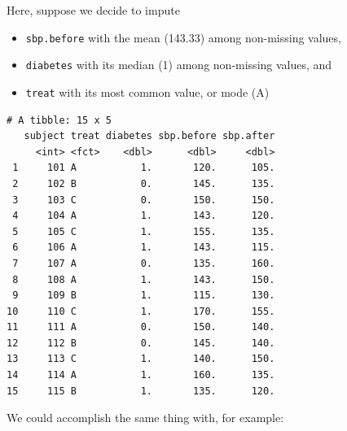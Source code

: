 \documentclass[]{book}
\newenvironment{Shaded}{\begin{snugshade}}{\end{snugshade}}
\newcommand{\KeywordTok}[1]{\textcolor[rgb]{0.13,0.29,0.53}{\textbf{#1}}}
\newcommand{\DataTypeTok}[1]{\textcolor[rgb]{0.13,0.29,0.53}{#1}}
\newcommand{\DecValTok}[1]{\textcolor[rgb]{0.00,0.00,0.81}{#1}}
\newcommand{\FloatTok}[1]{\textcolor[rgb]{0.00,0.00,0.81}{#1}}
\newcommand{\StringTok}[1]{\textcolor[rgb]{0.31,0.60,0.02}{#1}}
\newcommand{\OtherTok}[1]{\textcolor[rgb]{0.56,0.35,0.01}{#1}}
\newcommand{\OperatorTok}[1]{\textcolor[rgb]{0.81,0.36,0.00}{\textbf{#1}}}
\newcommand{\NormalTok}[1]{#1}
\providecommand{\tightlist}{%
  \setlength{\itemsep}{0pt}\setlength{\parskip}{0pt}}
\theoremstyle{definition}
\theoremstyle{definition}
\theoremstyle{definition}
\theoremstyle{remark}
\begin{document}
Here, suppose we decide to impute

\begin{itemize}
\tightlist
\item
  \texttt{sbp.before} with the mean (143.33) among non-missing values,
\item
  \texttt{diabetes} with its median (1) among non-missing values, and
\item
  \texttt{treat} with its most common value, or mode (A)
\end{itemize}

\begin{Shaded}
\end{Shaded}

\begin{verbatim}
# A tibble: 15 x 5
   subject treat diabetes sbp.before sbp.after
     <int> <fct>    <dbl>      <dbl>     <dbl>
 1     101 A           1.       120.      105.
 2     102 B           0.       145.      135.
 3     103 C           0.       150.      150.
 4     104 A           1.       143.      120.
 5     105 C           1.       155.      135.
 6     106 A           1.       143.      115.
 7     107 A           0.       135.      160.
 8     108 A           1.       143.      150.
 9     109 B           1.       115.      130.
10     110 C           1.       170.      155.
11     111 A           0.       150.      140.
12     112 B           0.       145.      140.
13     113 C           1.       140.      150.
14     114 A           1.       160.      135.
15     115 B           1.       135.      120.
\end{verbatim}

We could accomplish the same thing with, for example:

\begin{Shaded}
\end{Shaded}
\end{document}
